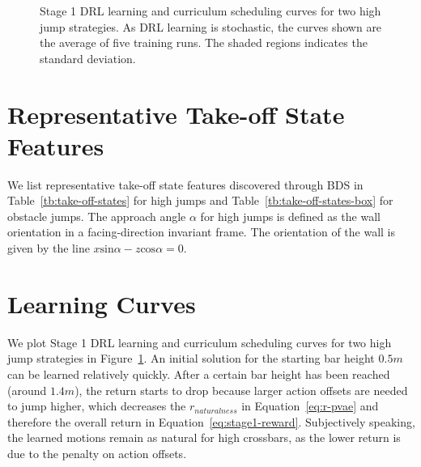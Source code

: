 \appendix



\begin{figure}[t]
    \centering
    \begin{subfigure}[b]{\linewidth}
        \centering
        \scalebox{0.56}{}
    \end{subfigure}
    \begin{subfigure}[b]{\linewidth}
        \centering
        \scalebox{0.56}{}
    \end{subfigure}
    \caption{{Stage 1 DRL learning and curriculum scheduling curves for two high jump strategies. As DRL learning is stochastic, the curves shown are the average of five training runs. The shaded regions indicates the standard deviation.}}
    \label{fig:learning-curves}
\end{figure}

\section{Representative Take-off State Features}
\label{app:takeoffStates}
We list representative take-off state features discovered through BDS in Table~\ref{tb:take-off-states} for high jumps and Table~\ref{tb:take-off-states-box} for obstacle jumps. The approach angle $\alpha$ for high jumps is defined as the wall orientation in a facing-direction invariant frame. The orientation of the wall is given by the line $x\text{sin}\alpha - z\text{cos}\alpha = 0$. 

\section{Learning Curves}
\label{app:curves}
{We plot Stage 1 DRL learning and curriculum scheduling curves for two high jump strategies in Figure~\ref{fig:learning-curves}. An initial solution for the starting bar height $0.5m$ can be learned relatively quickly. After a certain bar height has been reached (around $1.4m$), the return starts to drop  because larger action offsets are needed to jump higher, which decreases the $r_{naturalness}$ in Equation~\ref{eq:r-pvae} and therefore the overall return in Equation~\ref{eq:stage1-reward}. Subjectively speaking, the learned motions remain as natural for high crossbars, as the lower return is due to the penalty on action offsets.}
